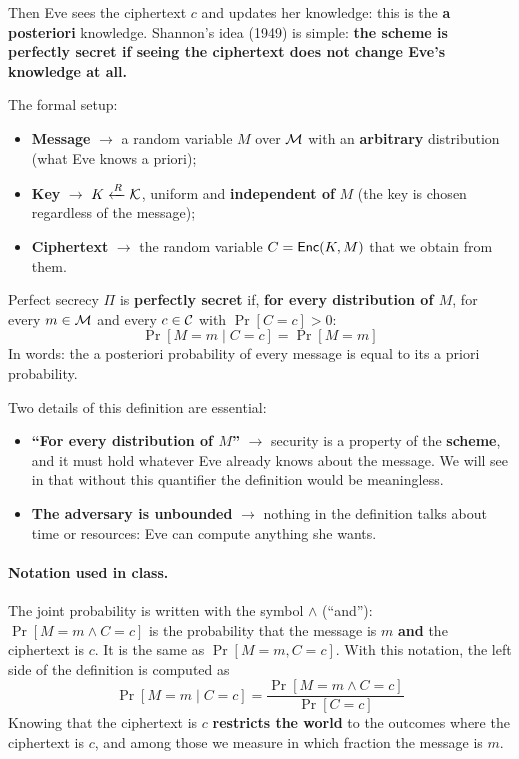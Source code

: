 Then Eve sees the ciphertext $c$ and updates her knowledge: this is the \textbf{a posteriori} knowledge. Shannon's idea (1949) is simple: \textbf{the scheme is perfectly secret if seeing the ciphertext does not change Eve's knowledge at all.}

The formal setup:
\begin{itemize}
  \item \textbf{Message} $\to$ a random variable $M$ over $\mathcal{M}$ with an \textbf{arbitrary} distribution (what Eve knows a priori);
  \item \textbf{Key} $\to$ $K \xleftarrow{R} \mathcal{K}$, uniform and \textbf{independent of} $M$ (the key is chosen regardless of the message);
  \item \textbf{Ciphertext} $\to$ the random variable $C = \mathsf{Enc}(K, M)$ that we obtain from them.
\end{itemize}

\begin{frameddefn}[label={def:perfect-secrecy}]{Perfect secrecy}
  $\Pi$ is \textbf{perfectly secret} if, \textbf{for every distribution of $M$}, for every $m \in \mathcal{M}$ and every $c \in \mathcal{C}$ with $\Pr[C = c] > 0$:
  \[
    \Pr[M = m \mid C = c] = \Pr[M = m]
  \]
  In words: the a posteriori probability of every message is equal to its a priori probability.
\end{frameddefn}

Two details of this definition are essential:
\begin{itemize}
  \item \textbf{``For every distribution of $M$''} $\to$ security is a property of the \textbf{scheme}, and it must hold whatever Eve already knows about the message. We will see in  that without this quantifier the definition would be meaningless.
  \item \textbf{The adversary is unbounded} $\to$ nothing in the definition talks about time or resources: Eve can compute anything she wants.
\end{itemize}

\paragraph{Notation used in class.} The joint probability is written with the symbol $\wedge$ (``and''): $\Pr[M = m \wedge C = c]$ is the probability that the message is $m$ \textbf{and} the ciphertext is $c$. It is the same as $\Pr[M = m, C = c]$. With this notation, the left side of the definition is computed as
\[
  \Pr[M = m \mid C = c] = \frac{\Pr[M = m \wedge C = c]}{\Pr[C = c]}
\]
Knowing that the ciphertext is $c$ \textbf{restricts the world} to the outcomes where the ciphertext is $c$, and among those we measure in which fraction the message is $m$.

